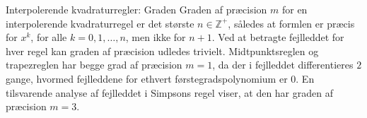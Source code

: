 \begin{frame}{Interpolerende kvadraturregler: Graden}
    Graden af præcision $m$ for en interpolerende kvadraturregel er det største $n \in \mathbb{Z^+}$, således at formlen er præcis for $x^k$, for alle $k = 0, 1, \ldots , n$, men ikke for $n+1$.
    Ved at betragte fejlleddet for hver regel kan graden af præcision udledes trivielt. 
    Midtpunktsreglen og trapezreglen har begge grad af præcision $m=1$, da der i fejlleddet differentieres $2$ gange, hvormed fejlleddene for ethvert førstegradspolynomium er $0$. 
    En tilsvarende analyse af fejlleddet i Simpsons regel viser, at den har graden af præcision $m=3$.
\end{frame}